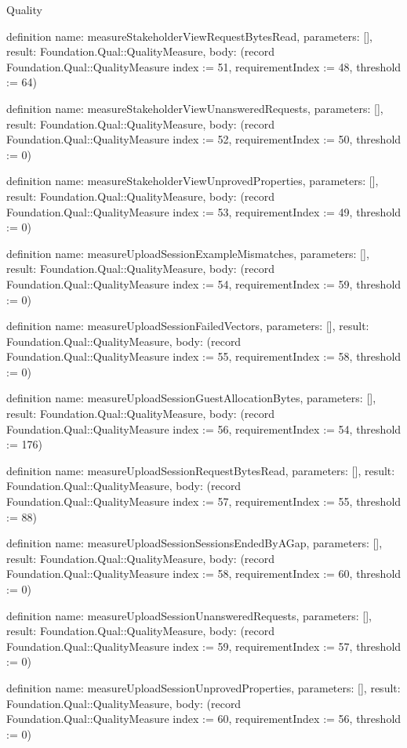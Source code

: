 \begin{lexlean}{Quality}
\begin{semanticmodule}
definition{
  name: measureStakeholderViewRequestBytesRead,
  parameters: [],
  result: Foundation.Qual::QualityMeasure,
  body: (record Foundation.Qual::QualityMeasure {index := 51, requirementIndex := 48, threshold := 64})
}

definition{
  name: measureStakeholderViewUnansweredRequests,
  parameters: [],
  result: Foundation.Qual::QualityMeasure,
  body: (record Foundation.Qual::QualityMeasure {index := 52, requirementIndex := 50, threshold := 0})
}

definition{
  name: measureStakeholderViewUnprovedProperties,
  parameters: [],
  result: Foundation.Qual::QualityMeasure,
  body: (record Foundation.Qual::QualityMeasure {index := 53, requirementIndex := 49, threshold := 0})
}

definition{
  name: measureUploadSessionExampleMismatches,
  parameters: [],
  result: Foundation.Qual::QualityMeasure,
  body: (record Foundation.Qual::QualityMeasure {index := 54, requirementIndex := 59, threshold := 0})
}

definition{
  name: measureUploadSessionFailedVectors,
  parameters: [],
  result: Foundation.Qual::QualityMeasure,
  body: (record Foundation.Qual::QualityMeasure {index := 55, requirementIndex := 58, threshold := 0})
}

definition{
  name: measureUploadSessionGuestAllocationBytes,
  parameters: [],
  result: Foundation.Qual::QualityMeasure,
  body: (record Foundation.Qual::QualityMeasure {index := 56, requirementIndex := 54, threshold := 176})
}

definition{
  name: measureUploadSessionRequestBytesRead,
  parameters: [],
  result: Foundation.Qual::QualityMeasure,
  body: (record Foundation.Qual::QualityMeasure {index := 57, requirementIndex := 55, threshold := 88})
}

definition{
  name: measureUploadSessionSessionsEndedByAGap,
  parameters: [],
  result: Foundation.Qual::QualityMeasure,
  body: (record Foundation.Qual::QualityMeasure {index := 58, requirementIndex := 60, threshold := 0})
}

definition{
  name: measureUploadSessionUnansweredRequests,
  parameters: [],
  result: Foundation.Qual::QualityMeasure,
  body: (record Foundation.Qual::QualityMeasure {index := 59, requirementIndex := 57, threshold := 0})
}

definition{
  name: measureUploadSessionUnprovedProperties,
  parameters: [],
  result: Foundation.Qual::QualityMeasure,
  body: (record Foundation.Qual::QualityMeasure {index := 60, requirementIndex := 56, threshold := 0})
}


\end{semanticmodule}
\end{lexlean}
